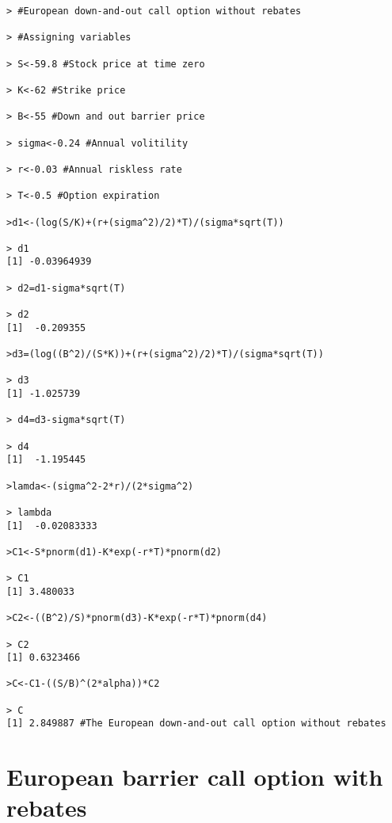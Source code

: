 \begin{lstlisting}
> #European down-and-out call option without rebates

> #Assigning variables

> S<-59.8 #Stock price at time zero 

> K<-62 #Strike price

> B<-55 #Down and out barrier price

> sigma<-0.24 #Annual volitility

> r<-0.03 #Annual riskless rate 

> T<-0.5 #Option expiration

>d1<-(log(S/K)+(r+(sigma^2)/2)*T)/(sigma*sqrt(T))

> d1
[1] -0.03964939

> d2=d1-sigma*sqrt(T)

> d2
[1]  -0.209355

>d3=(log((B^2)/(S*K))+(r+(sigma^2)/2)*T)/(sigma*sqrt(T))

> d3
[1] -1.025739

> d4=d3-sigma*sqrt(T)

> d4
[1]  -1.195445

>lamda<-(sigma^2-2*r)/(2*sigma^2)

> lambda
[1]  -0.02083333

>C1<-S*pnorm(d1)-K*exp(-r*T)*pnorm(d2)

> C1
[1] 3.480033

>C2<-((B^2)/S)*pnorm(d3)-K*exp(-r*T)*pnorm(d4)

> C2
[1] 0.6323466

>C<-C1-((S/B)^(2*alpha))*C2

> C
[1] 2.849887 #The European down-and-out call option without rebates
\end{lstlisting}

\newpage
\section{European barrier call option with rebates}

